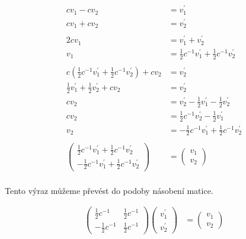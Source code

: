 \documentclass{article}
\begin{document}
\begin{align*}
    c v_1 - c v_2   & = v^\prime_1                        \\
    c v_1 + c v_2   & = v^\prime_2                        \\
    \\
    2 c v_1         & = v^\prime_1 + v^\prime_2           \\
    v_1             & =
    \tfrac{1}{2} c^{-1} v^\prime_1 +
    \tfrac{1}{2} c^{-1} v^\prime_2                        \\
    \\
    c \left(
    \tfrac{1}{2} c^{-1} v^\prime_1 +
    \tfrac{1}{2} c^{-1} v^\prime_2
    \right) + c v_2 & = v^\prime_2                        \\
    \tfrac{1}{2} v^\prime_1 + \tfrac{1}{2} v^\prime_2
    + c v_2         & = v^\prime_2                        \\
    c v_2           & = v^\prime_2 -
    \tfrac{1}{2} v^\prime_1 - \tfrac{1}{2} v^\prime_2     \\
    c v_2           & = \tfrac{1}{2} c^{-1} v^\prime_2 -
    \tfrac{1}{2} v^\prime_1                               \\
    v_2             & = -\tfrac{1}{2} c^{-1} v^\prime_1 +
    \tfrac{1}{2} c^{-1} v^\prime_2                        \\
    \\
    \begin{pmatrix}
        \tfrac{1}{2} c^{-1} v^\prime_1 +
        \tfrac{1}{2} c^{-1} v^\prime_2 \\
        - \tfrac{1}{2} c^{-1} v^\prime_1 +
        \tfrac{1}{2} c^{-1} v^\prime_2
    \end{pmatrix}
                    & =
    \begin{pmatrix}
        v_1 \\
        v_2
    \end{pmatrix}                                        \\
\end{align*}

Tento výraz můžeme převést do podoby násobení matice.

\begin{align*}
    \begin{pmatrix}
        \tfrac{1}{2} c^{-1}   & \tfrac{1}{2} c^{-1} \\
        - \tfrac{1}{2} c^{-1} & \tfrac{1}{2} c^{-1}
    \end{pmatrix}
    \begin{pmatrix}
        v^\prime_1 \\
        v^\prime_2
    \end{pmatrix}
     & =
    \begin{pmatrix}
        v_1 \\
        v_2
    \end{pmatrix}
\end{align*}
\end{document}
